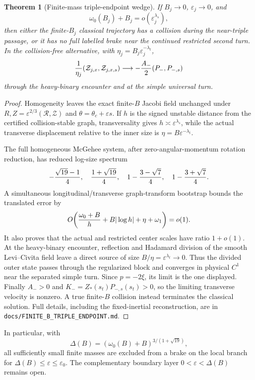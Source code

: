 \documentclass[11pt]{article}
\newtheorem{theorem}{Theorem}
\begin{document}
\begin{theorem}[Finite-mass triple-endpoint wedge]
If $B_j\to0$, $\varepsilon_j\to0$, and
\[
 \omega_0(B_j)+B_j=o(\varepsilon_j^{\lambda_s}),
\]
then either the finite-$B_j$ classical trajectory has a collision during the
near-triple passage, or it has no full labelled brake near the continued
restricted second turn. In the collision-free alternative, with
$\eta_j=B_j\varepsilon_j^{-\lambda_t}$,
\[
 {1\over\eta_j}(\mathcal Z_{j,x},\mathcal Z_{j,x,s})
 \longrightarrow -{A_-\over2}(P_-,P_{-,s})
\]
through the heavy-binary encounter and at the simple universal turn.
\end{theorem}
\begin{proof}
Homogeneity leaves the exact finite-$B$ Jacobi field unchanged under
$R,Z=\varepsilon^{2/3}(\mathcal R,\mathcal Z)$ and
$\theta=\theta_c+\varepsilon s$. If $h$ is the signed unstable distance from
the certified collision-stable graph, transversality gives
$h\asymp\varepsilon^{\lambda_s}$, while the actual transverse displacement
relative to the inner size is $\eta=B\varepsilon^{-\lambda_t}$.

The full homogeneous McGehee system, after zero-angular-momentum rotation
reduction, has reduced log-size spectrum
\[
 -{\sqrt{19}-1\over4},\quad {1+\sqrt{19}\over4},\quad
 1-{3-\sqrt7\over4},\quad 1-{3+\sqrt7\over4}.
\]
A simultaneous longitudinal/transverse graph-transform bootstrap bounds the
translated error by
\[
 O\!\left({\omega_0+B\over h}+B|\log h|+\eta+\omega_1\right)=o(1).
\]
It also proves that the actual and restricted center scales have ratio
$1+o(1)$. At the heavy-binary encounter, reflection and Hadamard division of
the smooth Levi--Civita field leave a direct source of size
$B/\eta=\varepsilon^{\lambda_t}\to0$. Thus the divided outer state passes
through the regularized block and converges in physical $C^1$ near the
separated simple turn. Since $p=-2\xi$, its limit is the one displayed.
Finally $A_->0$ and $K_-=Z_*(s_t)P_{-,s}(s_t)>0$, so the limiting transverse
velocity is nonzero. A true finite-$B$ collision instead terminates the
classical solution. Full details, including the fixed-inertial reconstruction,
are in \texttt{docs/FINITE\_B\_TRIPLE\_ENDPOINT.md}.
\end{proof}

In particular, with
\[
 \Delta(B)=(\omega_0(B)+B)^{3/(1+\sqrt{19})},
\]
all sufficiently small finite masses are excluded from a brake on the local
branch for $\Delta(B)\le\varepsilon\le\varepsilon_0$. The complementary
boundary layer $0<\varepsilon<\Delta(B)$ remains open.
\end{document}
